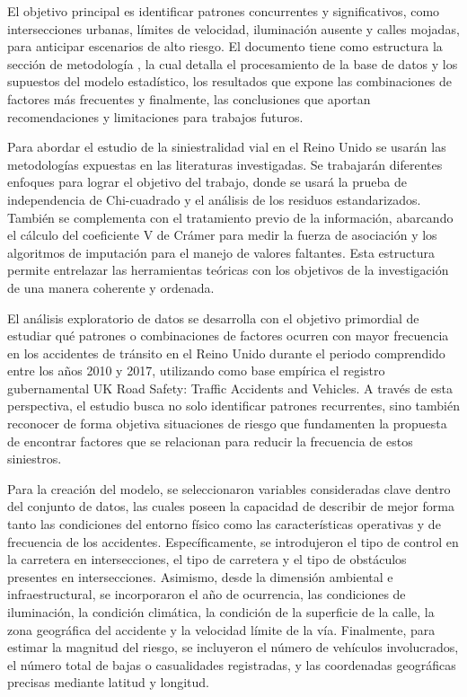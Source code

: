 \documentclass[12pt]{article}
\begin{document}
El objetivo principal es identificar patrones concurrentes y significativos, como 
intersecciones urbanas, límites de velocidad, iluminación ausente y calles mojadas, 
para anticipar escenarios de alto riesgo. El documento tiene como estructura la sección 
de metodología , la cual detalla el procesamiento de la base de datos y los supuestos del 
modelo estadístico, los resultados que expone las combinaciones de factores más frecuentes 
y finalmente, las conclusiones que aportan recomendaciones y limitaciones para trabajos futuros.

Para abordar el estudio de la siniestralidad vial en el Reino Unido se usarán las metodologías 
expuestas en las literaturas investigadas. Se trabajarán diferentes enfoques para lograr el 
objetivo del trabajo, donde se usará la prueba de independencia de Chi-cuadrado y el análisis 
de los residuos estandarizados. También se complementa  con el tratamiento previo de la 
información, abarcando el cálculo del coeficiente V de Crámer para medir la fuerza de 
asociación y los algoritmos de imputación para el manejo de valores faltantes. Esta 
estructura permite entrelazar las herramientas teóricas con los objetivos de la investigación 
de una manera coherente y ordenada.

El análisis exploratorio de datos se desarrolla con el objetivo primordial de estudiar qué 
patrones o combinaciones de factores ocurren con mayor frecuencia en los accidentes de 
tránsito en el Reino Unido durante el periodo comprendido entre los años 2010 y 2017, 
utilizando como base empírica el registro gubernamental UK Road Safety: Traffic Accidents 
and Vehicles. A través de esta perspectiva, el estudio busca no solo identificar patrones 
recurrentes, sino también reconocer de forma objetiva situaciones de riesgo que fundamenten 
la propuesta de encontrar factores que se relacionan para reducir la frecuencia de estos 
siniestros.

Para la creación del modelo, se seleccionaron variables consideradas clave dentro del 
conjunto de datos, las cuales poseen la capacidad de describir de mejor forma tanto las 
condiciones del entorno físico como las características operativas y de frecuencia de los 
accidentes. Específicamente, se introdujeron el tipo de control en la carretera en 
intersecciones, el tipo de carretera y el tipo de obstáculos presentes en intersecciones. 
Asimismo, desde la dimensión ambiental e infraestructural, se incorporaron el año de 
ocurrencia, las condiciones de iluminación, la condición climática, la condición de la 
superficie de la calle, la zona geográfica del accidente y la velocidad límite de la vía. 
Finalmente, para estimar la magnitud del riesgo, se incluyeron el número de vehículos 
involucrados, el número total de bajas o casualidades registradas, y las coordenadas 
geográficas precisas mediante latitud y longitud.
\end{document}
